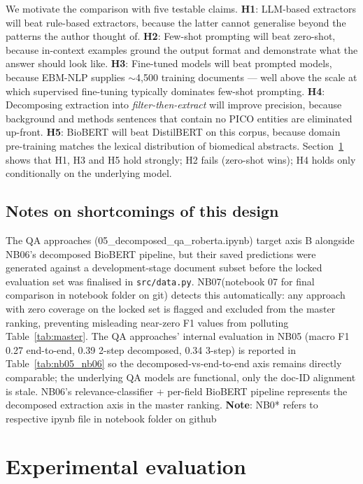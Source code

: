 \documentclass[11pt]{article}
\begin{document}
We motivate the comparison with five testable claims. \textbf{H1}:
LLM-based extractors will beat rule-based extractors, because the latter
cannot generalise beyond the patterns the author thought of.
\textbf{H2}: Few-shot prompting will beat zero-shot, because in-context
examples ground the output format and demonstrate what the answer
should look like. \textbf{H3}: Fine-tuned models will beat prompted
models, because EBM-NLP supplies $\sim$4{,}500 training documents ---
well above the scale at which supervised fine-tuning typically dominates
few-shot prompting. \textbf{H4}: Decomposing extraction into
\textit{filter-then-extract} will improve precision, because background
and methods sentences that contain no PICO entities are eliminated
up-front. \textbf{H5}: BioBERT will beat DistilBERT on this corpus,
because domain pre-training matches the lexical distribution of
biomedical abstracts. Section~\ref{sec:results} shows that H1, H3 and
H5 hold strongly; H2 fails (zero-shot wins); H4 holds only conditionally
on the underlying model.

\subsection{Notes on shortcomings of this design}

The QA approaches (05\_decomposed\_qa\_roberta.ipynb) target axis B alongside NB06's decomposed
BioBERT pipeline, but their saved predictions were generated against a
development-stage document subset before the locked evaluation set was
finalised in \texttt{src/data.py}. NB07(notebook 07 for final comparison in notebook folder on git) detects this automatically: any
approach with zero coverage on the locked set is flagged and excluded
from the master ranking, preventing misleading near-zero F1 values from
polluting Table~\ref{tab:master}. The QA approaches' internal evaluation
in NB05 (macro F1 0.27 end-to-end, 0.39 2-step decomposed, 0.34 3-step)
is reported in Table~\ref{tab:nb05_nb06} so the decomposed-vs-end-to-end
axis remains directly comparable; the underlying QA models are
functional, only the doc-ID alignment is stale. NB06's
relevance-classifier + per-field BioBERT pipeline represents the
decomposed extraction axis in the master ranking.
\textbf{Note}: NB0* refers to respective ipynb file in notebook folder on github

\section{Experimental evaluation}
\label{sec:results}
\end{document}
